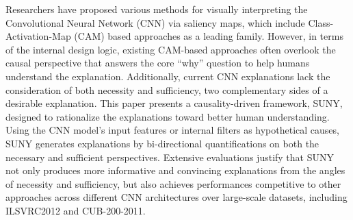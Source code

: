 Researchers have proposed various methods for visually interpreting the Convolutional Neural Network (CNN) via saliency maps, which include Class-Activation-Map (CAM) based approaches as a leading family. However, in terms of the internal design logic, existing CAM-based approaches often overlook the causal perspective that answers the core ``why'' question to help humans understand the explanation. Additionally, current CNN explanations lack the consideration of both necessity and sufficiency, two complementary sides of a desirable explanation. This paper presents a causality-driven framework, SUNY, designed to rationalize the explanations toward better human understanding. Using the CNN model's input features or internal filters as hypothetical causes, SUNY generates explanations by bi-directional quantifications on both the necessary and sufficient perspectives. Extensive evaluations justify that SUNY not only produces more informative and convincing explanations from the angles of necessity and sufficiency, but also achieves performances competitive to other approaches across different CNN architectures over large-scale datasets, including ILSVRC2012 and CUB-200-2011. 
